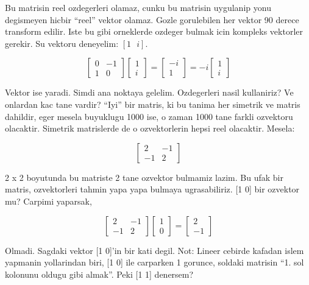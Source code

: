 \documentclass[12pt,fleqn]{article}\usepackage{../common}
\begin{document}
Bu matrisin reel ozdegerleri olamaz, cunku bu matrisin uygulanip yonu
degismeyen hicbir ``reel'' vektor olamaz. Gozle gorulebilen her vektor 90
derece transform edilir. Iste bu gibi orneklerde ozdeger bulmak icin
kompleks vektorler gerekir. Su vektoru deneyelim: $[1 \ \ \ i]$. 

\[ 
\left[\begin{array}{rr}
0 & -1 \\
1 & 0
\end{array}\right]
\left[\begin{array}{c}
1 \\
i
\end{array}\right]
= 
\left[\begin{array}{c}
-i \\
1
\end{array}\right]
= 
-i
\left[\begin{array}{c}
1 \\
i
\end{array}\right]
 \]

Vektor ise yaradi. Simdi ana noktaya gelelim. Ozdegerleri nasil
kullaniriz? Ve onlardan kac tane vardir? ``Iyi'' bir matris, ki bu tanima
her simetrik ve matris dahildir, eger mesela buyuklugu 1000 ise, o zaman
1000 tane farkli ozvektoru olacaktir. Simetrik matrislerde de o
ozvektorlerin hepsi reel olacaktir. Mesela:

\[ 
\left[\begin{array}{rr}
2 & -1 \\
-1 & 2
\end{array}\right]
 \]

2 x 2 boyutunda bu matriste 2 tane ozvektor bulmamiz lazim. Bu ufak bir
matris, ozvektorleri tahmin yapa yapa bulmaya ugrasabiliriz. [1 0] bir
ozvektor mu?  Carpimi yaparsak,

\[ 
\left[\begin{array}{rr}
2 & -1 \\
-1 & 2
\end{array}\right]
\left[\begin{array}{c}
1 \\
0
\end{array}\right]
=
\left[\begin{array}{r}
2 \\
-1
\end{array}\right]
 \]

Olmadi. Sagdaki vektor [1 0]'in bir kati degil. Not: Lineer cebirde kafadan
islem yapmanin yollarindan biri, [1 0] ile carparken 1 gorunce, soldaki
matrisin ``1. sol kolonunu oldugu gibi almak''. Peki [1 1]
denersem? 
\end{document}
